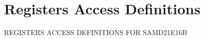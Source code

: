 \hypertarget{group___s_a_m_d21_e16_b__reg}{}\section{Registers Access Definitions}
\label{group___s_a_m_d21_e16_b__reg}
R\+E\+G\+I\+S\+T\+E\+RS A\+C\+C\+E\+SS D\+E\+F\+I\+N\+I\+T\+I\+O\+NS F\+OR S\+A\+M\+D21\+E16B 